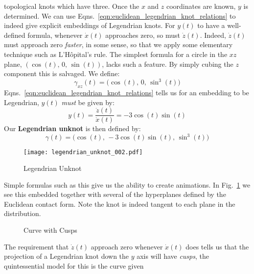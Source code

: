     topological knots which have three. Once the $x$ and $z$ coordinates are
    known, $y$ is determined. We can use
    Eqns.~\ref{eqn:euclidean_legendrian_knot_relations} to indeed give explicit
    embeddings of Legendrian knots. For $y(t)$ to have a well-defined formula,
    whenever $\dot{x}(t)$ approaches zero, so must $\dot{z}(t)$. Indeed,
    $\dot{z}(t)$ must approach zero \textit{faster}, in some sense, so that
    we apply some elementary technique such as L'H\^{o}pital's rule. The
    simplest formula for a circle in the $xz$ plane,
    $(\cos(t),\,0,\,\sin(t))$, lacks such a feature. By simply
    cubing the $z$ component this is salvaged. We define:
    \begin{equation}
        \gamma_{xz}(t)=\big(\cos(t),\,0,\,\sin^{3}(t)\big)
    \end{equation}
    Eqns.~\ref{eqn:euclidean_legendrian_knot_relations} tells us for an
    embedding to be Legendrian, $y(t)$ \textit{must} be given by:
    \begin{equation}
        y(t)=\frac{\dot{z}(t)}{\dot{x}(t)}=-3\cos(t)\sin(t)
    \end{equation}
    Our \textbf{Legendrian unknot} is then defined by:
    \begin{equation}
        \gamma(t)=\big(
            \cos(t),\,
            -3\cos(t)\sin(t),\,
            \sin^{3}(t)
        \big)
    \end{equation}
    \begin{figure}
        \centering
        \texttt{[image: legendrian\_unknot\_002.pdf]}
        \caption{Legendrian Unknot}
        \label{fig:legendrian_unknot_002}
    \end{figure}
    Simple formulas such as this give us the ability to create animations. In
    Fig.~\ref{fig:legendrian_unknot_002} we see this embedded together with
    several of the hyperplanes defined by the Euclidean contact form. Note the
    knot is indeed tangent to each plane in the distribution.
    \par\hfill\par
    \begin{figure}
        \centering
        \caption{Curve with Cusps}
        \label{fig:cusps_in_the_plane_001}
    \end{figure}
    The requirement that $\dot{z}(t)$ approach zero whenever $\dot{x}(t)$ does
    tells us that the projection of a Legendrian knot down the $y$ axis will
    have \textit{cusps}, the quintessential model for this is the curve given
